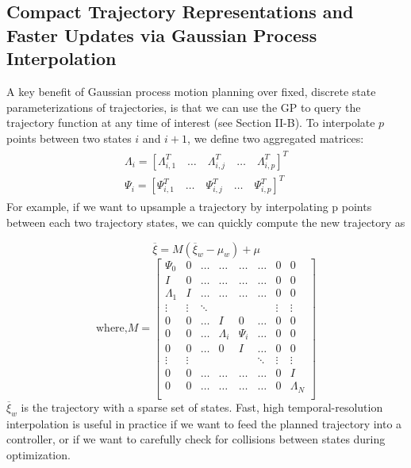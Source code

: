 \documentclass{IEEEtran}
\begin{document}
\subsection{Compact Trajectory Representations and Faster Updates
via Gaussian Process Interpolation}
A key benefit of Gaussian process motion planning over
fixed, discrete state parameterizations of trajectories, is that
we can use the GP to query the trajectory function at any
time of interest (see Section II-B). To interpolate $p$ points
between two states $i$ and $i + 1$, we define two aggregated
matrices:
\begin{equation*}
\begin{matrix}
\begin{split}
\Lambda_i=[\Lambda_{i,1}^T \quad \dots \quad \Lambda_{i,j}^T \quad \dots \quad\Lambda_{i,p}^T]^T\\
\Psi_i=[\Psi_{i,1}^T \quad \dots \quad \Psi_{i,j}^T \quad \dots \quad \Psi_{i,p}^T]^T
\end{split}
\tag{34}
\end{matrix}
\end{equation*}
For example, if we want to upsample a trajectory by interpolating p points between each two trajectory states, we can
quickly compute the new trajectory as

\begin{equation*}
\overline{\xi}=M(\overline{\xi}_w-{\mu}_w)+\mu\tag{35}
\end{equation*}
\[\text{where,}M=\begin{bmatrix}
\Psi_0&0&\dots&\dots&\dots&\dots&0&0\\
I&0&\dots&\dots&\dots&\dots&0&0\\
\Lambda_1&I&\dots&\dots&\dots&\dots&0&0\\
\vdots&\vdots&\ddots&&&&\vdots&\vdots\\
0&0&\dots&I&0&\dots&0&0\\
0&0&\dots&\Lambda_i&\Psi_i&\dots&0&0\\
0&0&\dots&0&I&\dots&0&0\\
\vdots&\vdots&&&&\ddots&\vdots&\vdots\\
0&0&\dots&\dots&\dots&\dots&0&I\\
0&0&\dots&\dots&\dots&\dots&0&\Lambda_N\\
\end{bmatrix}
\]
$\overline{\xi}_w$ is the trajectory with a sparse set of states. Fast, high
temporal-resolution interpolation is useful in practice if we
want to feed the planned trajectory into a controller, or if we
want to carefully check for collisions between states during
optimization.
\end{document}

